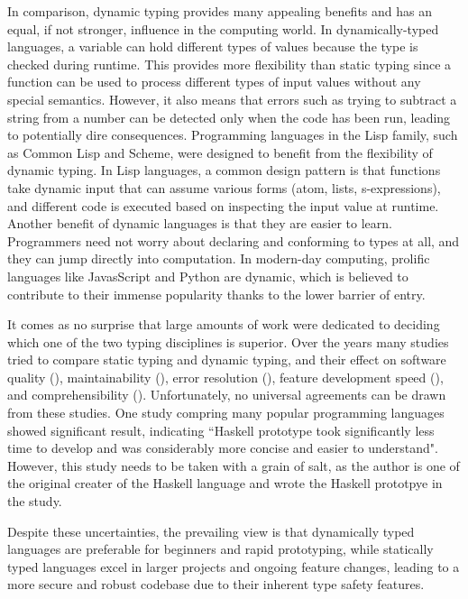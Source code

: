 In comparison, dynamic typing provides many appealing benefits and has an equal, if not stronger, influence in the computing world. In dynamically-typed languages, a variable can hold different types of values because the type is checked during runtime. This provides more flexibility than static typing since a function can be used to process different types of input values without any special semantics. However, it also means that errors such as trying to subtract a string from a number can be detected only when the code has been run, leading to potentially dire consequences. Programming languages in the Lisp family, such as Common Lisp and Scheme, were designed to benefit from the flexibility of dynamic typing. In Lisp languages, a common design pattern is that functions take dynamic input that can assume various forms (atom, lists, s-expressions), and different code is executed based on inspecting the input value at runtime. Another benefit of dynamic languages is that they are easier to learn. Programmers need not worry about declaring and conforming to types at all, and they can jump directly into computation. In modern-day computing, prolific languages like JavasScript and Python are dynamic, which is believed to contribute to their immense popularity thanks to the lower barrier of entry.



It comes as no surprise that large amounts of work were dedicated to deciding which one of the two typing disciplines is superior. Over the years many studies tried to compare static typing and dynamic typing, and their effect on software quality (\cite{Ray2017-gq, Gao2017-xn}), maintainability (\cite{Kleinschmager2012-bg}), error resolution (\cite{Prechelt1998-pd}), feature development speed (\cite{Prechelt2000-bf, Mayer2012-qc}), and comprehensibility (\cite{Endrikat2014-uz}).  Unfortunately, no universal agreements can be drawn from these studies. One study \cite{Hudak1994-ex} compring many popular programming languages showed significant result, indicating ``Haskell prototype took signiﬁcantly less time to develop and was considerably more concise and easier to understand".  However, this study needs to be taken with a grain of salt, as the author is one of the original creater of the Haskell language and wrote the Haskell prototpye in the study.

Despite these uncertainties, the prevailing view is that dynamically typed languages are preferable for beginners and rapid prototyping, while statically typed languages excel in larger projects and ongoing feature changes, leading to a more secure and robust codebase due to their inherent type safety features.


